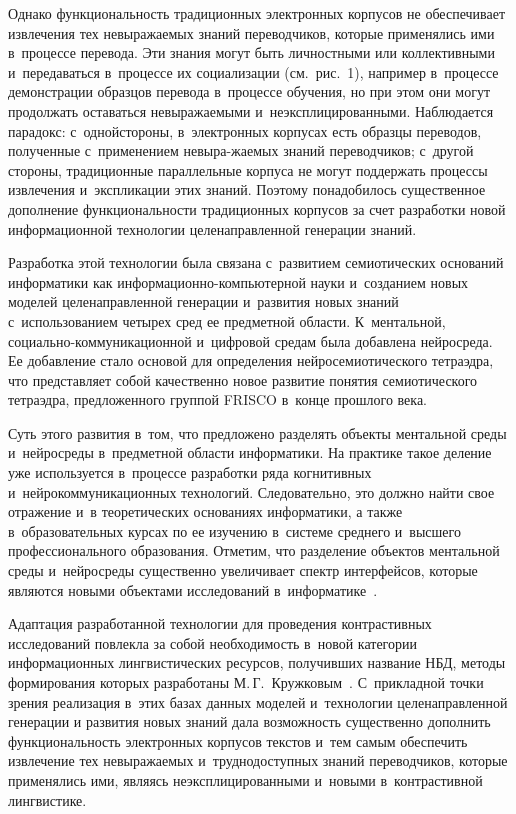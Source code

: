 {\begin{multicols}{2}
      Однако функциональность традиционных электронных корпусов не обеспечивает 
извлечения тех невыражаемых знаний переводчиков, которые применялись ими в~процессе 
перевода. Эти знания могут быть личностными или коллективными и~передаваться 
в~процессе их социализации (см.\ рис.~1), например в~процессе демонстрации образцов 
перевода в~процессе обучения, но при этом они могут продолжать оставаться 
невыражаемыми и~неэксплицированными. Наблюдается парадокс: с~одной\linebreak стороны, 
в~электронных корпусах есть образцы переводов, полученные с~применением невыра-\linebreak жа\-емых 
знаний переводчиков; с~другой стороны, традиционные параллельные корпуса не могут 
поддержать процессы извлечения и~экспликации этих знаний. Поэтому понадобилось 
существенное дополнение функциональности традиционных корпусов за счет разработки 
новой информационной технологии целенаправленной генерации знаний.
      
      Разработка этой технологии была связана с~развитием семиотических оснований 
информатики как ин\-фор\-ма\-ци\-он\-но-компью\-тер\-ной науки и~созданием новых 
моделей целенаправленной генерации и~развития новых знаний с~использованием четырех 
сред ее предметной области. К~ментальной, со\-ци\-аль\-но-ком\-му\-ни\-ка\-ци\-он\-ной и~цифровой 
средам была добавлена нейросреда. Ее добавление стало основой для определения 
нейросемиотического тет\-ра\-эдра, что представляет собой качественно новое развитие 
понятия семиотического тет\-ра\-эдра, предложенного группой FRISCO в~конце прошлого 
века.
      
      Суть этого развития в~том, что предложено разделять объекты ментальной среды 
      и~нейросреды в~предметной области информатики. На практике такое деление уже 
используется в~процессе разработки ряда когнитивных и~нейрокоммуникационных 
технологий. Следовательно, это должно найти свое отражение и~в теоретических 
основаниях информатики, а также в~образовательных курсах по ее изучению в~системе 
среднего и~высшего профессионального образования. Отметим, что разделение объектов 
ментальной среды и~нейросреды существенно увеличивает спектр интерфейсов, которые 
являются новыми объектами исследований в~информатике~\cite{12-zat}.
      
      Адаптация разработанной технологии для проведения контрастивных исследований 
повлекла за собой необходимость в~новой категории инфор\-мационных лингвистических 
ресурсов, получивших название НБД, методы формирования которых 
разработаны М.\,Г.~Кружковым~\cite{30-zat, 31-zat, 33-zat, 34-zat}. С~прикладной точки 
зрения реализация в~этих базах данных моделей и~технологии целена\-прав\-лен\-ной генерации 
и развития новых знаний дала возможность существенно дополнить функциональность 
электронных корпусов текстов и~тем самым обеспечить извлечение тех невыражаемых 
и~труд\-нодоступных знаний переводчиков, которые применялись ими, являясь 
неэксплицированными и~новыми в~контрастивной лингвистике.
      

\end{multicols}}
